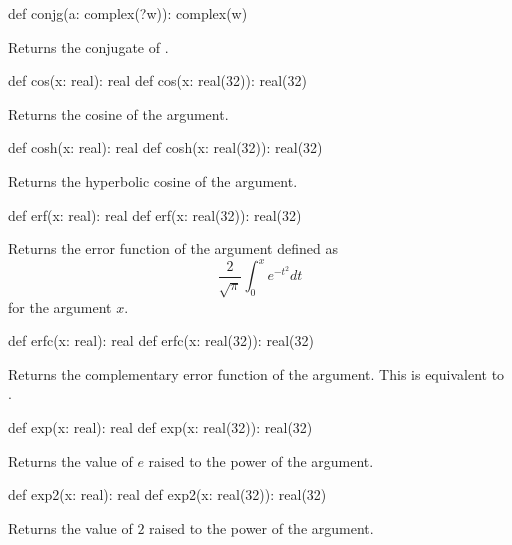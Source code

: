 \begin{protohead}
def conjg(a: complex(?w)): complex(w)
\end{protohead}
\begin{protobody}
Returns the conjugate of .
\end{protobody}

\begin{protohead}
def cos(x: real): real
def cos(x: real(32)): real(32)
\end{protohead}
\begin{protobody}
Returns the cosine of the argument.
\end{protobody}

\begin{protohead}
def cosh(x: real): real
def cosh(x: real(32)): real(32)
\end{protohead}
\begin{protobody}
Returns the hyperbolic cosine of the argument.
\end{protobody}

\begin{protohead}
def erf(x: real): real
def erf(x: real(32)): real(32)
\end{protohead}
\begin{protobody}
Returns the error function of the argument defined as
$$\frac{2}{\sqrt{\pi}}\int^x_0e^{-t^2}dt$$
for the argument $x$.
\end{protobody}

\begin{protohead}
def erfc(x: real): real
def erfc(x: real(32)): real(32)
\end{protohead}
\begin{protobody}
Returns the complementary error function of the argument.  This is
equivalent to .
\end{protobody}

\begin{protohead}
def exp(x: real): real
def exp(x: real(32)): real(32)
\end{protohead}
\begin{protobody}
Returns the value of $e$ raised to the power of the argument.
\end{protobody}

\begin{protohead}
def exp2(x: real): real
def exp2(x: real(32)): real(32)
\end{protohead}
\begin{protobody}
Returns the value of $2$ raised to the power of the argument.
\end{protobody}

